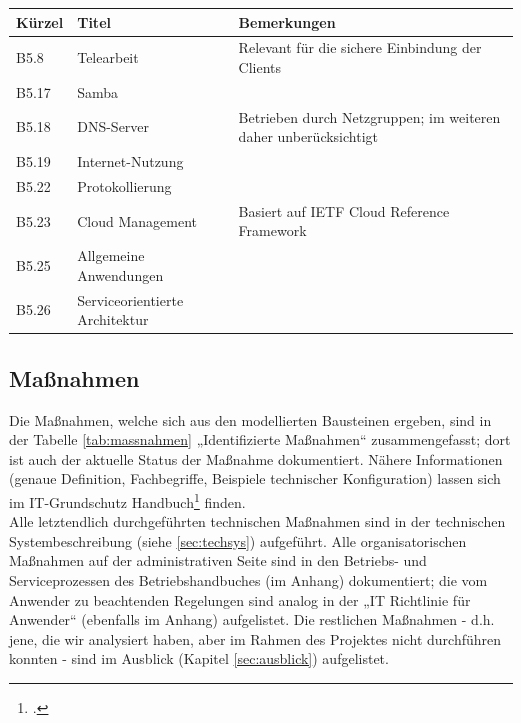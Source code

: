 \begin{minipage}{\textwidth}
\begin{center}
\begin{tabular}{p{1cm}p{5cm}p{9cm}}
\toprule
Kürzel 	& Titel & Bemerkungen \\
\midrule
B5.8	& Telearbeit	& Relevant für die sichere Einbindung der Clients \\
B5.17	& Samba			& \\
B5.18	& DNS-Server	& Betrieben durch Netzgruppen; im weiteren daher unberücksichtigt \\
B5.19	& Internet-Nutzung	& \\
B5.22	& Protokollierung	& \\
B5.23	& Cloud Management	& Basiert auf IETF Cloud Reference Framework \\
B5.25	& Allgemeine Anwendungen	& \\
B5.26	& Serviceorientierte Architektur	& \\
\bottomrule
\end{tabular}
\end{center}
\end{minipage}

\subsection{Maßnahmen}
Die Maßnahmen, welche sich aus den modellierten Bausteinen ergeben, sind in der Tabelle \ref{tab:massnahmen} „Identifizierte Maßnahmen“ zusammengefasst; dort ist auch der aktuelle Status der Maßnahme dokumentiert. Nähere Informationen (genaue Definition, Fachbegriffe, Beispiele technischer Konfiguration) lassen sich im IT-Grundschutz Handbuch\footcite{grundschutz} finden.\\

Alle letztendlich durchgeführten technischen Maßnahmen sind in der technischen Systembeschreibung (siehe \ref{sec:techsys}) aufgeführt. Alle organisatorischen Maßnahmen auf der administrativen Seite sind in den Betriebs- und Serviceprozessen des Betriebshandbuches (im Anhang) dokumentiert;  die vom Anwender zu beachtenden Regelungen sind analog in der „IT Richtlinie für Anwender“ (ebenfalls im Anhang) aufgelistet. Die restlichen Maßnahmen - d.h. jene, die wir analysiert haben, aber im Rahmen des Projektes nicht durchführen konnten - sind im Ausblick (Kapitel \ref{sec:ausblick}) aufgelistet.

